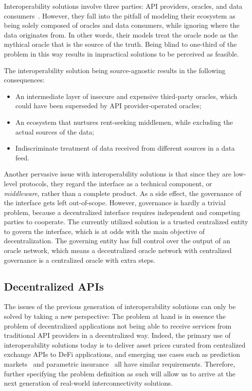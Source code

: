 \documentclass[11pt]{article}
\begin{document}
Interoperability solutions involve three parties: API providers, oracles, and data consumers~\cite{benligiray:2019}.
However, they fall into the pitfall of modeling their ecosystem as being solely composed of oracles and data consumers, while ignoring where the data originates from.
In other words, their models treat the oracle node as the mythical oracle that is the source of the truth.
Being blind to one-third of the problem in this way results in impractical solutions to be perceived as feasible.

The interoperability solution being source-agnostic results in the following consequences:
\begin{itemize}
    \item An intermediate layer of insecure and expensive third-party oracles, which could have been superseded by API provider-operated oracles;
    \item An ecosystem that nurtures rent-seeking middlemen, while excluding the actual sources of the data;
    \item Indiscriminate treatment of data received from different sources in a data feed.
\end{itemize}

Another pervasive issue with interoperability solutions is that since they are low-level protocols, they regard the interface as a technical component, or \textit{middleware}, rather than a complete product.
As a side effect, the governance of the interface gets left out-of-scope.
However, governance is hardly a trivial problem, because a decentralized interface requires independent and competing parties to cooperate.
The currently utilized solution is a trusted centralized entity to govern the interface, which is at odds with the main objective of decentralization.
The governing entity has full control over the output of an oracle network, which means a decentralized oracle network with centralized governance is a centralized oracle with extra steps.

\subsection{Decentralized APIs}
\label{sec:decentralized-apis}

The issues of the previous generation of interoperability solutions can only be solved by taking a new perspective: The problem at hand is in essence the problem of decentralized applications not being able to receive services from traditional API providers in a decentralized way.
Indeed, the primary use of interoperability solutions today is to deliver asset prices curated from centralized exchange APIs to DeFi applications, and emerging use cases such as prediction markets~\cite{omen} and parametric insurance~\cite{capgemini:2019b} all have similar requirements.
Therefore, further specifying the problem definition as such will allow us to arrive at the next generation of real-world interconnectivity solutions.
\end{document}
